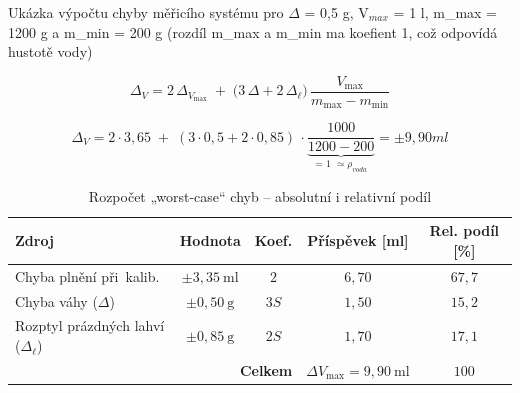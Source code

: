 
\bigskip
Ukázka výpočtu chyby měřicího systému pro $\Delta$ = 0,5 g, V$_{max}$ = 1 l, m\_max = 1200 g a m\_min = 200 g (rozdíl m\_max a m\_min ma koefient 1, což odpovídá hustotě vody)

\[
\Delta_V = 2\,\Delta_{V_{\text{max}}}
      \;+\;
      \bigl(3\,\Delta+2\,\Delta_{\ell}\bigr)\,
      \frac{V_{\max}}{m_{\max}-m_{\min}}
\]

\[
\Delta_V = 2 \cdot 3,65
      \;+\;
      (3\cdot0,5+2\cdot0,85)\,
      \cdot\underbrace{\frac{1000}{1200-200}}_{\text{= 1 $\simeq \rho_{voda}$}}=\pm 9,90 ml
\]



\begin{table}[h]
\centering
\caption{Rozpočet „worst-case“ chyb – absolutní i relativní podíl}
\renewcommand{\arraystretch}{1.15}
\begin{tabular}{@{}lcccc@{}}
\toprule
\textbf{Zdroj} & \textbf{Hodnota} & \textbf{Koef.} & \textbf{Příspěvek [ml]} & \textbf{Rel. podíl [\%]}\\
\midrule
Chyba plnění při~kalib.        & $\pm3{,}35\ \mathrm{ml}$ & $2$ & $6{,}70$ & $67{,}7$\\
Chyba váhy (\(\Delta\))        & $\pm0{,}50\ \mathrm{g}$ & $3S$ & $1{,}50$ & $15{,}2$\\
Rozptyl prázdných lahví (\(\Delta_\ell\))
                               & $\pm0{,}85\ \mathrm{g}$ & $2S$ & $1{,}70$ & $17{,}1$\\
\midrule
\multicolumn{3}{r}{\textbf{Celkem}} &
\(\boxed{\Delta V_{\text{max}} = 9{,}90\ \mathrm{ml}}\) & $100$\\
\bottomrule
\end{tabular}
\label{tab:worst_case_budget_rel}
\end{table}



